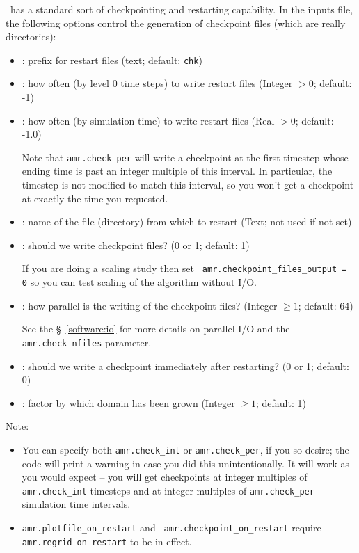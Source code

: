 \castro\ has a standard sort of checkpointing and restarting capability. 
In the inputs file, the following options control the generation of
checkpoint files (which are really directories):
\begin{itemize}
\item {}: prefix for restart files (text;
  default: {\tt chk})

\item {}: how often (by level 0 time steps) to
  write restart files (Integer $> 0$; default: -1)

\item {}: how often (by simulation time) to
  write restart files (Real $> 0$; default: -1.0)

  Note that {\tt amr.check\_per} will write a checkpoint at the first
  timestep whose ending time is past an integer multiple of this interval.
  In particular, the timestep is not modified to match this interval, so
  you won't get a checkpoint at exactly the time you requested.

\item {}: name of the file (directory) from
  which to restart (Text; not used if not set)

\item {}: should we write
  checkpoint files? (0 or 1; default: 1)

  If you are doing a scaling study then set {\tt
    amr.checkpoint\_files\_output = 0} so you can test scaling of the
  algorithm without I/O.

\item {}: how parallel is the writing of
  the checkpoint files?  (Integer $\geq 1$; default: 64)

  See the \S~\ref{software:io} for more details on parallel I/O and the 
  {\tt amr.check\_nfiles} parameter.

\item {}: should we write a
  checkpoint immediately after restarting?  (0 or 1; default: 0)

\item {}: factor by which domain has been
  grown (Integer $\geq 1$; default: 1)
\end{itemize}


Note:
\begin{itemize}

\item You can specify both {\tt amr.check\_int} or {\tt amr.check\_per},
  if you so desire; the code will print a warning in case you did this
  unintentionally. It will work as you would expect -- you will get checkpoints
  at integer multiples of {\tt amr.check\_int} timesteps and at integer
  multiples of {\tt amr.check\_per} simulation time intervals.

\item {\tt amr.plotfile\_on\_restart} and {\tt
  amr.checkpoint\_on\_restart} require {\tt amr.regrid\_on\_restart}
  to be in effect.
\end{itemize}

